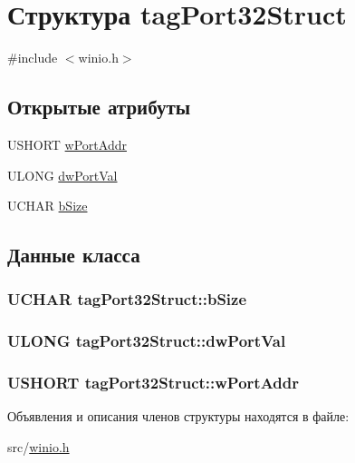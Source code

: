 \hypertarget{structtag_port32_struct}{\section{Структура tag\-Port32\-Struct}
\label{structtag_port32_struct}
}


{\ttfamily \#include $<$winio.\-h$>$}

\subsection*{Открытые атрибуты}
\begin{DoxyCompactItemize}
\item 
U\-S\-H\-O\-R\-T \hyperlink{structtag_port32_struct_addb73b4335431a2d9c4e2901306e5201}{w\-Port\-Addr}
\item 
U\-L\-O\-N\-G \hyperlink{structtag_port32_struct_a5de18d48b5fac0c2926ab0967ac4d05c}{dw\-Port\-Val}
\item 
U\-C\-H\-A\-R \hyperlink{structtag_port32_struct_a07f16a83ec991068c4d7aebe0386435a}{b\-Size}
\end{DoxyCompactItemize}


\subsection{Данные класса}
\hypertarget{structtag_port32_struct_a07f16a83ec991068c4d7aebe0386435a}{
\subsubsection[{b\-Size}]{\setlength{\rightskip}{0pt plus 5cm}U\-C\-H\-A\-R tag\-Port32\-Struct\-::b\-Size}}\label{structtag_port32_struct_a07f16a83ec991068c4d7aebe0386435a}
\hypertarget{structtag_port32_struct_a5de18d48b5fac0c2926ab0967ac4d05c}{
\subsubsection[{dw\-Port\-Val}]{\setlength{\rightskip}{0pt plus 5cm}U\-L\-O\-N\-G tag\-Port32\-Struct\-::dw\-Port\-Val}}\label{structtag_port32_struct_a5de18d48b5fac0c2926ab0967ac4d05c}
\hypertarget{structtag_port32_struct_addb73b4335431a2d9c4e2901306e5201}{
\subsubsection[{w\-Port\-Addr}]{\setlength{\rightskip}{0pt plus 5cm}U\-S\-H\-O\-R\-T tag\-Port32\-Struct\-::w\-Port\-Addr}}\label{structtag_port32_struct_addb73b4335431a2d9c4e2901306e5201}


Объявления и описания членов структуры находятся в файле\-:\begin{DoxyCompactItemize}
\item 
src/\hyperlink{winio_8h}{winio.\-h}\end{DoxyCompactItemize}
